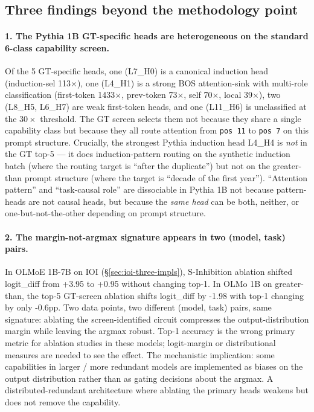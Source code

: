 \documentclass[11pt]{article}
\begin{document}
\subsection{Three findings beyond the methodology point}

\paragraph{1. The Pythia 1B GT-specific heads are heterogeneous on the standard 6-class capability screen.}
Of the 5 GT-specific heads, one (L7\_H0) is a canonical induction head (induction-sel 113$\times$), one (L4\_H1) is a strong BOS attention-sink with multi-role classification (first-token 1433$\times$, prev-token 73$\times$, self 70$\times$, local 39$\times$), two (L8\_H5, L6\_H7) are weak first-token heads, and one (L11\_H6) is unclassified at the $30\times$ threshold. The GT screen selects them not because they share a single capability class but because they all route attention from \texttt{pos 11} to \texttt{pos 7} on this prompt structure. Crucially, the strongest Pythia induction head L4\_H4 is \emph{not} in the GT top-5 --- it does induction-pattern routing on the synthetic induction batch (where the routing target is ``after the duplicate'') but not on the greater-than prompt structure (where the target is ``decade of the first year''). ``Attention pattern'' and ``task-causal role'' are dissociable in Pythia 1B not because pattern-heads are not causal heads, but because the \emph{same head} can be both, neither, or one-but-not-the-other depending on prompt structure.

\paragraph{2. The margin-not-argmax signature appears in two (model, task) pairs.}
In OLMoE 1B-7B on IOI (\S\ref{sec:ioi-three-impls}), S-Inhibition ablation shifted logit\_diff from +3.95 to +0.95 without changing top-1. In OLMo 1B on greater-than, the top-5 GT-screen ablation shifts logit\_diff by -1.98 with top-1 changing by only -0.6pp. Two data points, two different (model, task) pairs, same signature: ablating the screen-identified circuit compresses the output-distribution margin while leaving the argmax robust. Top-1 accuracy is the wrong primary metric for ablation studies in these models; logit-margin or distributional measures are needed to see the effect. The mechanistic implication: some capabilities in larger / more redundant models are implemented as biases on the output distribution rather than as gating decisions about the argmax. A distributed-redundant architecture where ablating the primary heads weakens but does not remove the capability.
\end{document}
